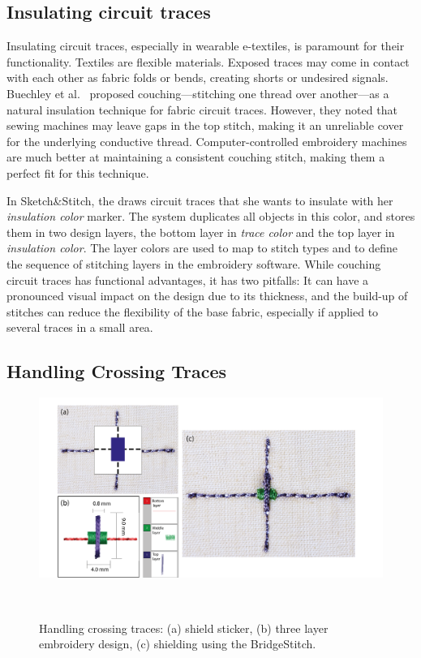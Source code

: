 \documentclass{sigchi}
\begin{document}
\subsection{Insulating circuit traces}
Insulating circuit traces, especially in wearable e-textiles, is paramount for their functionality. Textiles are flexible materials. Exposed traces may come in contact with each other as fabric folds or bends, creating shorts or undesired signals. Buechley et al.\ \cite{Buechley2009} proposed couching---stitching one thread over another---as a natural insulation technique for fabric circuit traces. However, they noted that sewing machines may leave gaps in the top stitch, making it an unreliable cover for the underlying conductive thread. Computer-controlled embroidery machines are much better at maintaining a consistent couching stitch, making them a perfect fit for this technique.


In Sketch\&Stitch, the draws circuit traces that she wants to insulate with her \textit{insulation color} marker. The system duplicates all objects in this color, and stores them in two design layers, the bottom layer in \textit{trace color} and the top layer in \textit{insulation color}. The layer colors are used to map to stitch types and to define the sequence of stitching layers in the embroidery software. 
While couching circuit traces has functional advantages, it has two pitfalls: It can have a pronounced visual impact on the design due to its thickness, and the build-up of stitches can reduce the flexibility of the base fabric, especially if applied to several traces in a small area.

\subsection{Handling Crossing Traces}
\begin{figure}
\centering
  \includegraphics[width=1\columnwidth]{figures/BridgeStitch}
  \caption{Handling crossing traces: (a) shield sticker, (b) three layer embroidery design, (c) shielding using the BridgeStitch.}~\label{fig:BridgeStitch}
  \vspace{-1.5em}
\end{figure}
\end{document}
